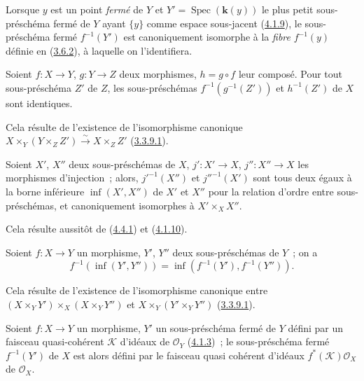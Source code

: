 Lorsque $y$ est un point \emph{fermé} de $Y$ et
$Y'=\operatorname{Spec}(\boldsymbol{k}(y))$ le plus petit sous-préschéma fermé de $Y$ ayant
$\{y\}$ comme espace sous-jacent (\hyperref[I.4.1.9-fr]{4.1.9}), le
sous-préschéma fermé $f^{-1}(Y')$ est canoniquement isomorphe à la
\emph{fibre} $f^{-1}(y)$ définie en (\hyperref[I.3.6.2-fr]{3.6.2}), à
laquelle on l'identifiera.

\begin{corollary}[4.4.2]
\label{I.4.4.2-fr}
Soient $f:X\to Y$, $g:Y\to Z$ deux morphismes, $h=g\circ f$ leur composé.
Pour tout sous-préschéma $Z'$ de $Z$, les sous-préschémas
$f^{-1}(g^{-1}(Z'))$ et $h^{-1}(Z')$ de $X$ sont identiques.
\end{corollary}

Cela résulte de l'existence de l'isomorphisme canonique
$X\times_Y(Y\times_Z Z')\xrightarrow{\sim}X\times_Z Z'$
(\hyperref[I.3.3.9.1-fr]{3.3.9.1}).

\begin{corollary}[4.4.3]
\label{I.4.4.3-fr}
Soient $X'$, $X''$ deux sous-préschémas de $X$, $j':X'\to X$,
$j'':X''\to X$ les morphismes d'injection~; alors, ${j'}^{-1}(X'')$ et
${j''}^{-1}(X')$ sont tous deux égaux à la borne inférieure
$\inf(X',X'')$ de $X'$ et $X''$ pour la relation d'ordre entre
sous-préschémas, et canoniquement isomorphes à $X'\times_X X''$.
\end{corollary}

Cela résulte aussitôt de (\hyperref[I.4.4.1-fr]{4.4.1}) et
(\hyperref[I.4.1.10-fr]{4.1.10}).

\begin{corollary}[4.4.4]
\label{I.4.4.4-fr}
Soient $f:X\to Y$ un morphisme, $Y'$, $Y''$ deux sous-préschémas de $Y$~;
on a
\[
  f^{-1}(\inf(Y',Y''))=\inf(f^{-1}(Y'),f^{-1}(Y'')).
\]
\end{corollary}

Cela résulte de l'existence de l'isomorphisme canonique entre
$(X\times_Y Y')\times_X(X\times_Y Y'')$ et
$X\times_Y(Y'\times_Y Y'')$ (\hyperref[I.3.3.9.1-fr]{3.3.9.1}).

\begin{proposition}[4.4.5]
\label{I.4.4.5-fr}
Soient $f:X\to Y$ un morphisme, $Y'$ un sous-préschéma fermé de $Y$ défini
par un faisceau quasi-cohérent $\mathscr{K}$ d'idéaux de $\mathscr{O}_Y$
(\hyperref[I.4.1.3-fr]{4.1.3})~; le sous-préschéma fermé $f^{-1}(Y')$ de $X$
est alors défini par le faisceau quasi cohérent d'idéaux
$f^*(\mathscr{K})\mathscr{O}_X$ de $\mathscr{O}_X$.
\end{proposition}

